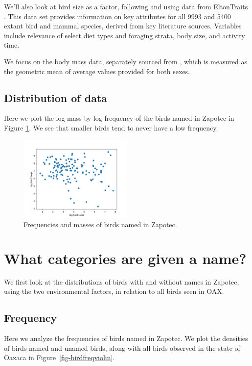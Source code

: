 \documentclass[10pt,letterpaper]{article}
\begin{document}
We'll also look at bird size as a factor, following \cite{hunn1999size} and using data from EltonTraits \cite{wilman2014eltontraits}.  This data set provides information on key attributes for all 9993 and 5400 extant bird and mammal species, derived from key literature sources. Variables include relevance of select diet types and foraging strata, body size, and activity time.

We focus on the body mass data, separately sourced from \cite{dunning2007crc}, which is measured as the geometric mean of average values provided for both sexes.

\subsection{Distribution of data}
Here we plot the log mass by log frequency of the birds named in Zapotec in Figure \ref{fig-birdmassxfreq}. We see that smaller birds tend to never have a low frequency.

\begin{figure}[h!]
  \begin{center}
    \includegraphics[width=0.5\textwidth]{./figures/bird_massxfreq.png}
        \caption{Frequencies and masses of birds named in Zapotec.}
        \label{fig-birdmassxfreq}
  \end{center}
\end{figure}


\section{What categories are given a name?}

We first look at the distributions of birds with and without names in Zapotec, using the two environmental factors, in relation to all birds seen in OAX.

\subsection{Frequency}
Here we analyze the frequencies of birds named in Zapotec. We plot the densities of birds named and unamed birds, along with all birds observed in the state of Oaxaca in Figure~\ref{fig-birdfreqviolin}.
\end{document}
